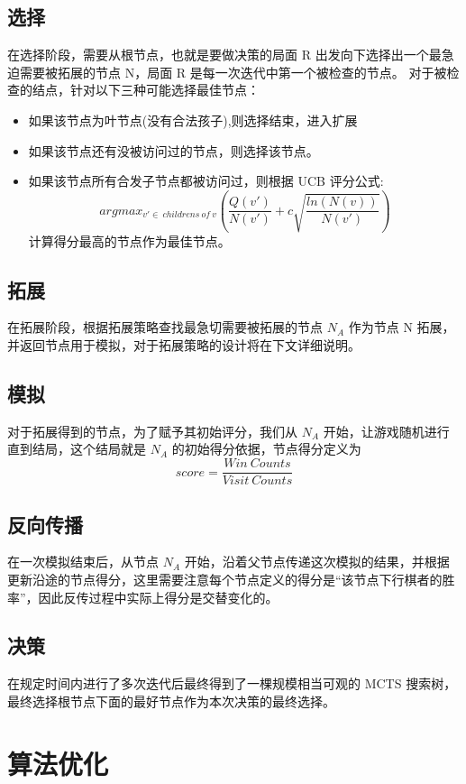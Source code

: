 \documentclass{article}
\begin{document}
\begin{spacing}{1.1}
	\subsection{选择}
	\hspace{1.4em}
	在选择阶段，需要从根节点，也就是要做决策的局面 R 出发向下选择出一个最急迫需要被拓展的节点 N，局面 R 是每一次迭代中第一个被检查的节点。
	对于被检查的结点，针对以下三种可能选择最佳节点：
	\begin{itemize}
		\item 如果该节点为叶节点(没有合法孩子),则选择结束，进入扩展
		\item 如果该节点还有没被访问过的节点，则选择该节点。
		\item 如果该节点所有合发子节点都被访问过，则根据 UCB 评分公式:
		$$
		argmax_{v'\in\ childrens\ of\ v} (\frac{Q(v')}{N(v')}+c\sqrt{\frac{ln(N(v))}{N(v')}}) 
		$$
		计算得分最高的节点作为最佳节点。
	\end{itemize}
	\subsection{拓展}
	\hspace{1.4em}
	在拓展阶段，根据拓展策略查找最急切需要被拓展的节点 $N_A$ 作为节点 N 拓展，并返回节点用于模拟，对于拓展策略的设计将在下文详细说明。
	\subsection{模拟}
	\hspace{1.4em}
	对于拓展得到的节点，为了赋予其初始评分，我们从 $N_A$ 开始，让游戏随机进行直到结局，这个结局就是 $N_A$ 的初始得分依据，节点得分定义为 
	$$
	score = \frac{Win\ Counts}{Visit\ Counts}
	$$
	\subsection{反向传播}
	\hspace{1.4em}
	在一次模拟结束后，从节点 $N_A$ 开始，沿着父节点传递这次模拟的结果，并根据更新沿途的节点得分，这里需要注意每个节点定义的得分是“该节点下行棋者的胜率”，因此反传过程中实际上得分是交替变化的。
	 
	\subsection{决策}
	在规定时间内进行了多次迭代后最终得到了一棵规模相当可观的 MCTS 搜索树，最终选择根节点下面的最好节点作为本次决策的最终选择。

\section{算法优化}

\end{spacing}
\end{document}
